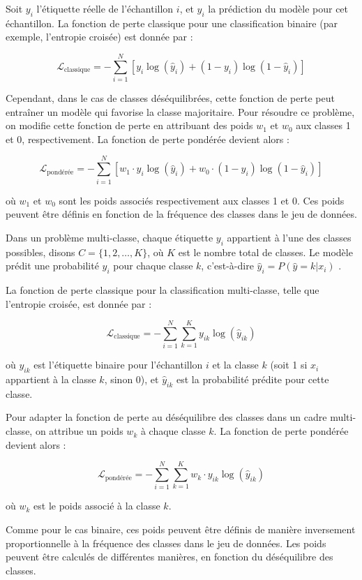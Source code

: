 \documentclass[12pt]{report}
\begin{document}
Soit $y_i$ l'étiquette réelle de l'échantillon $i$, et $\hat{y}_i$ la prédiction du modèle pour cet échantillon. La fonction de perte classique pour une classification binaire (par exemple, l'entropie croisée) est donnée par :

$$
\mathcal{L}_\text{classique} = - \sum_{i=1}^{N} \left[ y_i \log(\hat{y}_i) + (1 - y_i) \log(1 - \hat{y}_i) \right]
$$

Cependant, dans le cas de classes déséquilibrées, cette fonction de perte peut entraîner un modèle qui favorise la classe majoritaire. Pour résoudre ce problème, on modifie cette fonction de perte en attribuant des poids $w_1$ et $w_0$ aux classes 1 et 0, respectivement. La fonction de perte pondérée devient alors :

$$
\mathcal{L}_\text{pondérée} = - \sum_{i=1}^{N} \left[ w_1 \cdot y_i \log(\hat{y}_i) + w_0 \cdot (1 - y_i) \log(1 - \hat{y}_i) \right]
$$

où $w_1$ et $w_0$ sont les poids associés respectivement aux classes 1 et 0. Ces poids peuvent être définis en fonction de la fréquence des classes dans le jeu de données. 


\vspace{1em}
Dans un problème multi-classe, chaque étiquette $y_i$ appartient à l'une des classes possibles, disons $C = \{1, 2, \dots, K\}$, où $K$ est le nombre total de classes. Le modèle prédit une probabilité $\hat{y}_i$ pour chaque classe $k$, c'est-à-dire $\hat{y}_i = P(\hat{y} = k | x_i)$ \cite{Han2005Borderline}.

La fonction de perte classique pour la classification multi-classe, telle que l'entropie croisée, est donnée par :

$$
\mathcal{L}_\text{classique} = - \sum_{i=1}^{N} \sum_{k=1}^{K} y_{ik} \log(\hat{y}_{ik})
$$

où $y_{ik}$ est l'étiquette binaire pour l'échantillon $i$ et la classe $k$ (soit 1 si $x_i$ appartient à la classe $k$, sinon 0), et $\hat{y}_{ik}$ est la probabilité prédite pour cette classe.

Pour adapter la fonction de perte au déséquilibre des classes dans un cadre multi-classe, on attribue un poids $w_k$ à chaque classe $k$. La fonction de perte pondérée devient alors :

$$
\mathcal{L}_\text{pondérée} = - \sum_{i=1}^{N} \sum_{k=1}^{K} w_k \cdot y_{ik} \log(\hat{y}_{ik})
$$

où $w_k$ est le poids associé à la classe $k$.

Comme pour le cas binaire, ces poids peuvent être définis de manière inversement proportionnelle à la fréquence des classes dans le jeu de données. Les poids peuvent être calculés de différentes manières, en fonction du déséquilibre des classes. 
\end{document}
